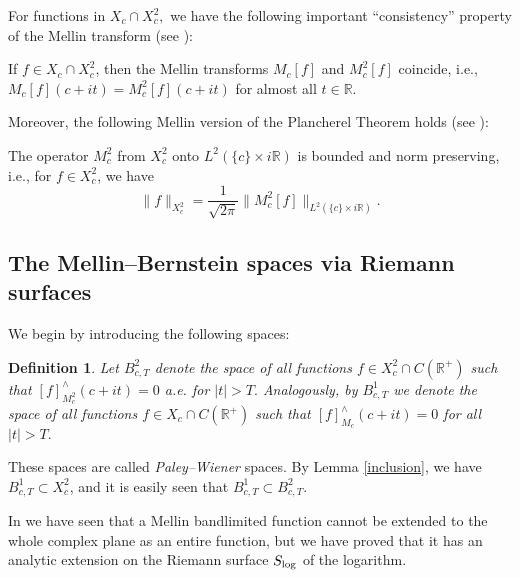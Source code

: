 \documentclass[amsmath,english,a4paper,graphicx,12pt]{article}
\begin{document}
For functions in $X_c \cap X^2_c,$ we have the following important ``consistency'' property of the Mellin transform (see \cite{BJ4}):
\begin{Lemma} \label{consistency}
If $f \in X_c \cap X^2_c$, then the Mellin transforms $M_c[f]$ and $M_c^2[f]$ coincide, i.e., $M_c[f](c+it) = M_c^2[f](c+it)$ for almost all $t \in \mathbb{R}.$
\end{Lemma}
Moreover, the following Mellin version of the Plancherel Theorem holds (see \cite[Lemma 2.6]{BJ4}):
\begin{Lemma}\label{Plancherel}
The operator $M_c^2$ from $X^2_c$ onto $L^2(\{c\}\times i \mathbb{R})$ is bounded and norm preserving, i.e., for $f \in X^2_c$, we have
$$\|f\|_{X^2_c}= \frac{1}{\sqrt{2\pi}}\|M_c^2[f]\|_{L^2(\{c\}\times i \mathbb{R})}.$$
\end{Lemma}



\subsection{The Mellin--Bernstein spaces via Riemann surfaces}

We begin by introducing the following spaces:
 \newtheorem{Definition}{Definition}
\begin{Definition}\label{def1}
Let $B^{2}_{c, T}$ denote the space of all functions  $f\in X_c^2\cap C(\mathbb{R}^+)$ 
such that $[f]^\wedge_{M_c^2}(c+it) = 0$ a.e. for $|t| > T.$ Analogously, by $B^1_{c,T}$ we denote the space of all functions $f\in X_c\cap C(\mathbb{R}^+)$ 
such that $[f]^\wedge_{M_c}(c+it) = 0$ for all $|t| > T.$
\end{Definition}
These spaces are called {\it Paley--Wiener} spaces.
By Lemma \ref{inclusion}, we have $B^1_{c,T} \subset X^2_c$, and 
it is easily seen that $B^1_{c,T} \subset B^2_{c, T}.$ 

In \cite{BBMS} we have seen that a Mellin bandlimited function cannot be extended to the whole complex plane as an entire function, but 
we have proved  that it has an analytic extension on the Riemann surface $S_{{\rm log}}$ of the logarithm. 
\end{document}
